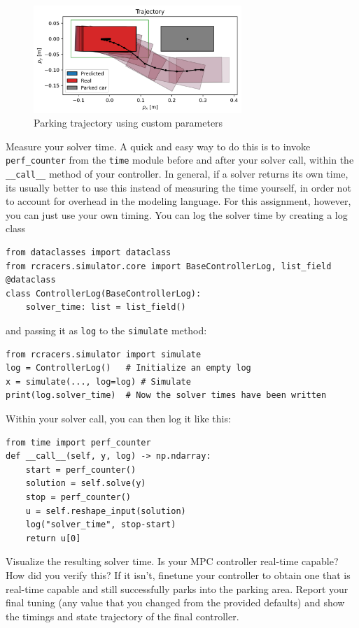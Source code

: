\documentclass[]{article}
\begin{document}
\begin{figure}[H]
    \centering
    \includegraphics[width=0.7\textwidth]{images/Assignment_45.png}
    \caption{Parking trajectory using custom parameters}
    \label{fig:assignment4_5}
\end{figure}



\begin{assignment}
	Measure your solver time. A quick and easy way to do this is to invoke \texttt{perf\_counter} 
	from the \texttt{time} module before and after your solver call, within the \texttt{\_\_call\_\_} 
	method of your controller. In general, if a solver returns its own time, its usually better to use this instead of measuring the time yourself, in order 
	not to account for overhead in the modeling language. For this assignment, however, you can just use your own timing.
	You can log the solver time by 
	creating a log class 
	\begin{lstlisting}[style=python]
from dataclasses import dataclass
from rcracers.simulator.core import BaseControllerLog, list_field
@dataclass
class ControllerLog(BaseControllerLog): 
    solver_time: list = list_field()
	\end{lstlisting}
	and passing it as \texttt{log} to the \texttt{simulate} method:
	\begin{lstlisting}[style=python]
from rcracers.simulator import simulate
log = ControllerLog()   # Initialize an empty log 
x = simulate(..., log=log) # Simulate 
print(log.solver_time)  # Now the solver times have been written 
	\end{lstlisting}
	Within your solver call, you can then log it like this:
	\begin{lstlisting}[style=python]
from time import perf_counter
def __call__(self, y, log) -> np.ndarray:
	start = perf_counter()
	solution = self.solve(y)
	stop = perf_counter()
	u = self.reshape_input(solution)
	log("solver_time", stop-start)
	return u[0]
	\end{lstlisting}
	Visualize the resulting solver time. Is your MPC controller real-time capable? How did you verify this? If it isn't, finetune your controller to 
	obtain one that is real-time capable and still successfully parks into the parking area.
	Report your final tuning (any value that you changed from the provided defaults)
	and show the timings and state trajectory of the final controller.
\end{assignment}
\end{document}
